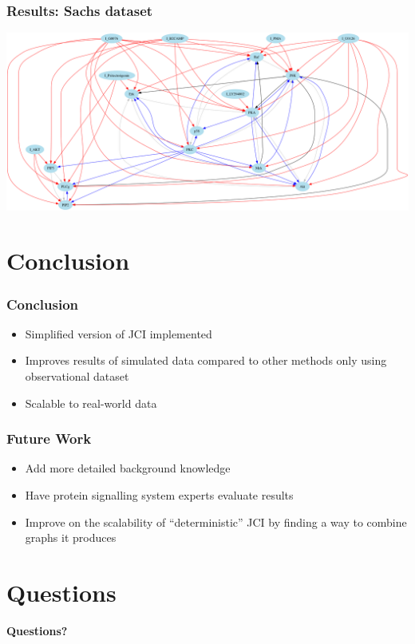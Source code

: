 \documentclass[10pt, compress]{beamer}
\newcommand{\Sara}[1]{{\color{blue} Sara: #1}}
\begin{document}
\begin{frame}
    \frametitle{Results: Sachs dataset}
    \center
    \includegraphics[width=\textwidth]{sachsGraph_bootstrap0_priorTRUEgfciANCSETRAL}
    
\end{frame}


\section{Conclusion}
\begin{frame}
    \frametitle{Conclusion}
    \begin{itemize}
        \item Simplified version of JCI implemented %
        \item Improves results of simulated data compared to other methods only using observational dataset %
        \item Scalable to real-world data
    \end{itemize}
\end{frame}

\begin{frame}
    \frametitle{Future Work}
    \begin{itemize}
        \item Add more detailed background knowledge %
        \item Have protein signalling system experts evaluate results
        \item Improve on the scalability of ``deterministic'' JCI by finding a way to combine graphs it produces
    \end{itemize}
\end{frame}



\section{Questions}
\begin{frame}{}
\begin{center}
\Huge \textbf{Questions?}
\end{center}
\end{frame}
\end{document}

